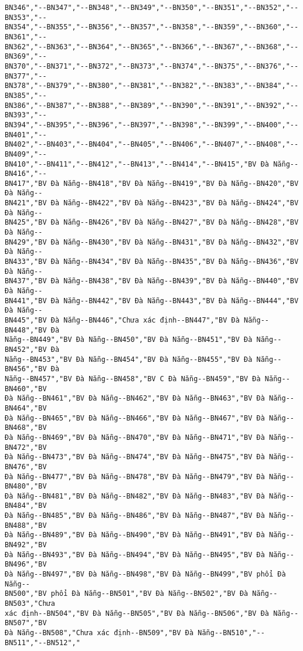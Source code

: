 \documentclass[11pt]{article}
\begin{document}
\begin{tcolorbox}[breakable, size=fbox, boxrule=.5pt, pad at break*=1mm, opacityfill=0]
\begin{Verbatim}[commandchars=\\\{\}]
BN346","--BN347","--BN348","--BN349","--BN350","--BN351","--BN352","--BN353","--
BN354","--BN355","--BN356","--BN357","--BN358","--BN359","--BN360","--BN361","--
BN362","--BN363","--BN364","--BN365","--BN366","--BN367","--BN368","--BN369","--
BN370","--BN371","--BN372","--BN373","--BN374","--BN375","--BN376","--BN377","--
BN378","--BN379","--BN380","--BN381","--BN382","--BN383","--BN384","--BN385","--
BN386","--BN387","--BN388","--BN389","--BN390","--BN391","--BN392","--BN393","--
BN394","--BN395","--BN396","--BN397","--BN398","--BN399","--BN400","--BN401","--
BN402","--BN403","--BN404","--BN405","--BN406","--BN407","--BN408","--BN409","--
BN410","--BN411","--BN412","--BN413","--BN414","--BN415","BV Đà Nẵng--BN416","--
BN417","BV Đà Nẵng--BN418","BV Đà Nẵng--BN419","BV Đà Nẵng--BN420","BV Đà Nẵng--
BN421","BV Đà Nẵng--BN422","BV Đà Nẵng--BN423","BV Đà Nẵng--BN424","BV Đà Nẵng--
BN425","BV Đà Nẵng--BN426","BV Đà Nẵng--BN427","BV Đà Nẵng--BN428","BV Đà Nẵng--
BN429","BV Đà Nẵng--BN430","BV Đà Nẵng--BN431","BV Đà Nẵng--BN432","BV Đà Nẵng--
BN433","BV Đà Nẵng--BN434","BV Đà Nẵng--BN435","BV Đà Nẵng--BN436","BV Đà Nẵng--
BN437","BV Đà Nẵng--BN438","BV Đà Nẵng--BN439","BV Đà Nẵng--BN440","BV Đà Nẵng--
BN441","BV Đà Nẵng--BN442","BV Đà Nẵng--BN443","BV Đà Nẵng--BN444","BV Đà Nẵng--
BN445","BV Đà Nẵng--BN446","Chưa xác định--BN447","BV Đà Nẵng--BN448","BV Đà
Nẵng--BN449","BV Đà Nẵng--BN450","BV Đà Nẵng--BN451","BV Đà Nẵng--BN452","BV Đà
Nẵng--BN453","BV Đà Nẵng--BN454","BV Đà Nẵng--BN455","BV Đà Nẵng--BN456","BV Đà
Nẵng--BN457","BV Đà Nẵng--BN458","BV C Đà Nẵng--BN459","BV Đà Nẵng--BN460","BV
Đà Nẵng--BN461","BV Đà Nẵng--BN462","BV Đà Nẵng--BN463","BV Đà Nẵng--BN464","BV
Đà Nẵng--BN465","BV Đà Nẵng--BN466","BV Đà Nẵng--BN467","BV Đà Nẵng--BN468","BV
Đà Nẵng--BN469","BV Đà Nẵng--BN470","BV Đà Nẵng--BN471","BV Đà Nẵng--BN472","BV
Đà Nẵng--BN473","BV Đà Nẵng--BN474","BV Đà Nẵng--BN475","BV Đà Nẵng--BN476","BV
Đà Nẵng--BN477","BV Đà Nẵng--BN478","BV Đà Nẵng--BN479","BV Đà Nẵng--BN480","BV
Đà Nẵng--BN481","BV Đà Nẵng--BN482","BV Đà Nẵng--BN483","BV Đà Nẵng--BN484","BV
Đà Nẵng--BN485","BV Đà Nẵng--BN486","BV Đà Nẵng--BN487","BV Đà Nẵng--BN488","BV
Đà Nẵng--BN489","BV Đà Nẵng--BN490","BV Đà Nẵng--BN491","BV Đà Nẵng--BN492","BV
Đà Nẵng--BN493","BV Đà Nẵng--BN494","BV Đà Nẵng--BN495","BV Đà Nẵng--BN496","BV
Đà Nẵng--BN497","BV Đà Nẵng--BN498","BV Đà Nẵng--BN499","BV phổi Đà Nẵng--
BN500","BV phổi Đà Nẵng--BN501","BV Đà Nẵng--BN502","BV Đà Nẵng--BN503","Chưa
xác định--BN504","BV Đà Nẵng--BN505","BV Đà Nẵng--BN506","BV Đà Nẵng--BN507","BV
Đà Nẵng--BN508","Chưa xác định--BN509","BV Đà Nẵng--BN510","--BN511","--BN512","

\end{Verbatim}
\end{tcolorbox}
\end{document}
